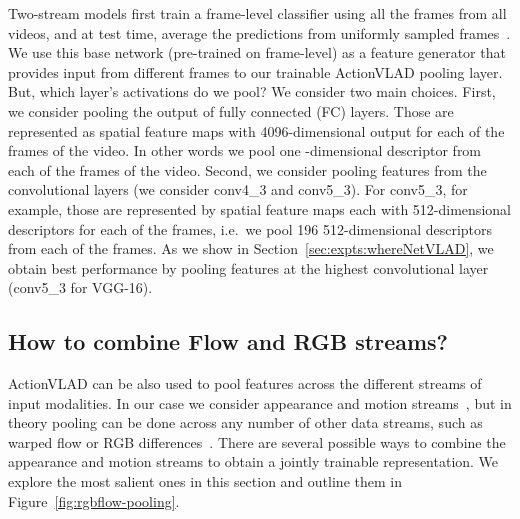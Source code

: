 \documentclass[10pt,twocolumn,letterpaper]{article}
\newcommand{\methodTag}[0]{ActionVLAD}
\begin{document}
Two-stream models first train a frame-level classifier using all the frames
from all videos, and at test time, average the predictions from 
uniformly sampled frames~\cite{Simonyan_14b,WangL_16a}. We use
this base network (pre-trained on frame-level) as a feature generator that provides input  from different frames to our trainable \methodTag{} pooling layer.
But, which layer's activations do we pool?
We consider two main choices.
First, we consider pooling the output of fully connected (FC) layers. Those are represented as  spatial feature maps with 4096-dimensional output for each of the  frames of the video.  In other words we pool one -dimensional descriptor from each of the  frames of the video.  Second, we consider pooling features from the convolutional layers (we consider conv4\_3 and conv5\_3). For conv5\_3, for example, those are represented by  spatial feature maps each with 512-dimensional descriptors for each of the  frames, i.e.\ we pool 196 512-dimensional descriptors from each of the  frames. 
As we show in Section~\ref{sec:expts:whereNetVLAD}, we obtain 
best performance by pooling features at the highest convolutional layer
(conv5\_3 for VGG-16).







\subsection{How to combine Flow and RGB streams?}\label{sec:combine-flow-rgb}

\methodTag{} can be also used to pool features across the different streams of input
modalities. In our case we consider appearance and motion streams~\cite{Simonyan_14b}, but in theory pooling can be done across any number of other data streams,
such as  warped flow or RGB differences~\cite{WangL_16a}.
There are several possible ways to combine the appearance and motion streams to obtain a
jointly trainable representation. We explore the most salient ones in this section and outline them in Figure~\ref{fig:rgbflow-pooling}.
\end{document}

